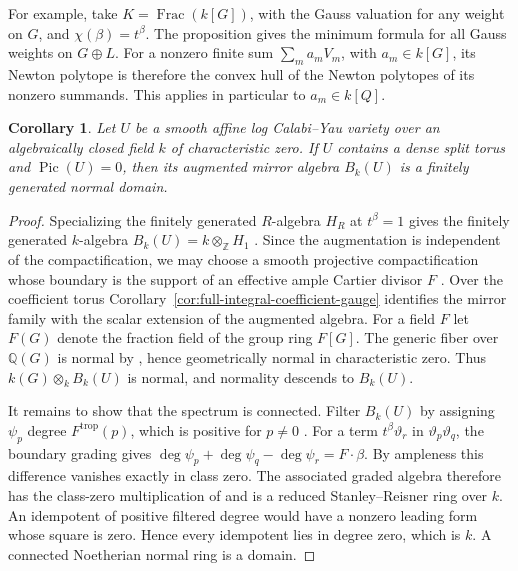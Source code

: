 \documentclass[11pt,reqno]{amsart}
\numberwithin{equation}{section}
\newtheorem{corollary}[theorem]{Corollary}
\theoremstyle{definition}
\theoremstyle{remark}
\DeclareMathOperator{\Frac}{Frac}
\DeclareMathOperator{\Pic}{Pic}
\begin{document}
For example, take \(K=\Frac(k[G])\), with the Gauss valuation for any
weight on \(G\), and \(\chi(\beta)=t^\beta\). The proposition gives
the minimum formula for all Gauss weights on \(G\oplus L\). For a
nonzero finite sum \(\sum_m a_m V_m\), with \(a_m\in k[G]\), its
Newton polytope is therefore the convex hull of the Newton polytopes
of its nonzero summands. This applies in particular to \(a_m\in k[Q]\).

\begin{corollary}\label{cor:augmentation-normal}
Let \(U\) be a smooth affine log Calabi--Yau variety over an
algebraically closed field \(k\) of characteristic zero. If \(U\)
contains a dense split torus and \(\Pic(U)=0\), then its augmented
mirror algebra \(B_k(U)\) is a finitely generated normal domain.
\end{corollary}
\begin{proof}
Specializing the finitely generated \(R\)-algebra \(H_R\) at
\(t^\beta=1\) gives the finitely generated \(k\)-algebra
\(B_k(U)=k\otimes_{\mathbb Z}H_1\) \cite[Theorem~16.8]{KY}.
Since the augmentation is independent of the compactification, we may
choose a smooth projective compactification whose boundary is the
support of an effective ample Cartier divisor \(F\)
\cite[Proposition~17.3 and Lemma~19.2]{KY}.
Over the coefficient torus Corollary~\ref{cor:full-integral-coefficient-gauge}
identifies the mirror family with the scalar extension of the augmented
algebra. For a field \(F\) let \(F(G)\) denote the fraction field of
the group ring \(F[G]\). The generic fiber over \(\mathbb Q(G)\) is normal by
\cite[Proposition~19.1]{KY}, hence geometrically normal in characteristic
zero. Thus \(k(G)\otimes_k B_k(U)\) is normal, and normality descends to
\(B_k(U)\).

It remains to show that the spectrum is connected. Filter \(B_k(U)\)
by assigning \(\psi_p\) degree \(F^{\mathrm{trop}}(p)\), which is
positive for \(p\ne0\) \cite[Lemma~15.2]{KY}. For a term
\(t^\beta\vartheta_r\) in \(\vartheta_p\vartheta_q\), the
boundary grading gives
\(\deg\psi_p+\deg\psi_q-\deg\psi_r=F\cdot\beta\).
By ampleness this difference vanishes exactly in class zero. The
associated graded algebra therefore has the class-zero multiplication
of \cite[Proposition~15.12]{KY} and is a reduced Stanley--Reisner
ring over \(k\). An idempotent of positive filtered degree would have
a nonzero leading form whose square is zero. Hence every idempotent
lies in degree zero, which is \(k\). A connected Noetherian normal
ring is a domain.
\end{proof}
\end{document}
